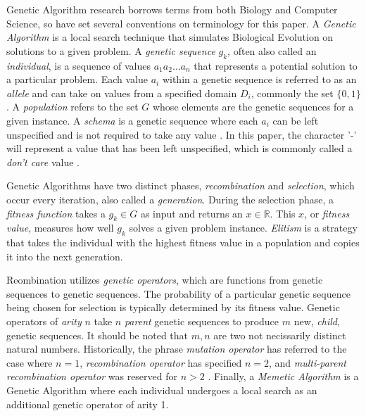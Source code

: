 Genetic Algorithm research borrows terms from both Biology and Computer Science, so have set several conventions on terminology for this paper. A \emph{Genetic Algorithm} is a local search technique that simulates Biological Evolution on solutions to a given problem. A \emph{genetic sequence} $g_k$, often also called an \emph{individual}, is a sequence of values $a_1 a_2\ldots a_n$ that represents a potential solution to a particular problem. Each value $a_i$ within a genetic sequence is referred to as an \emph{allele} and can take on values from a specified domain $D_i$, commonly the set $\{0,1\}$. A \emph{population} refers to the set $G$ whose elements are the genetic sequences for a given instance. A \emph{schema} is a genetic sequence where each $a_i$ can be left unspecified and is not required to take any value \cite{Russell10}. In this paper, the character '-' will represent a value that has been left unspecified, which is commonly called a \emph{don't care} value \cite{Holland75}.

Genetic Algorithms have two distinct phases, \emph{recombination} and \emph{selection}, which occur every iteration, also called a \emph{generation}. During the selection phase, a \emph{fitness function} takes a $g_k \in G$ as input and returns an $x \in \mathbb{R}$. This $x$, or \emph{fitness value}, measures how well $g_k$ solves a given problem instance. \emph{Elitism} is a strategy that takes the individual with the highest fitness value in a population and copies it into the next generation.

Reombination utilizes \emph{genetic operators}, which are functions from genetic sequences to genetic sequences. The probability of a particular genetic sequence being chosen for selection is typically determined by its fitness value. Genetic operators of \emph{arity} $n$ take $n$ \emph{parent} genetic sequences to produce $m$ new, \emph{child}, genetic sequences. It should be noted that $m, n$ are two not necissarily distinct natural numbers.  Historically, the phrase \emph{mutation operator} has referred to the case where $n = 1$, \emph{recombination operator} has specified $n = 2$, and \emph{multi-parent recombination operator} was reserved for $n > 2$ \cite{Eiben94}. Finally, a \emph{Memetic Algorithm} is a Genetic Algorithm where each individual undergoes a local search as an additional genetic operator of arity 1.